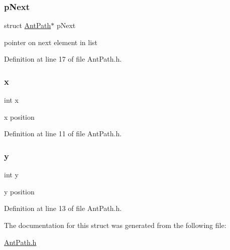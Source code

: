 \subsubsection{\texorpdfstring{p\+Next}{pNext}}
{\footnotesize\ttfamily struct \mbox{\hyperlink{struct_ant_path}{Ant\+Path}}$\ast$ p\+Next}

pointer on next element in list 

Definition at line 17 of file Ant\+Path.\+h.

\mbox{\label{struct_ant_path_a6150e0515f7202e2fb518f7206ed97dc}} 
\subsubsection{\texorpdfstring{x}{x}}
{\footnotesize\ttfamily int x}

x position 

Definition at line 11 of file Ant\+Path.\+h.

\mbox{\label{struct_ant_path_a0a2f84ed7838f07779ae24c5a9086d33}} 
\subsubsection{\texorpdfstring{y}{y}}
{\footnotesize\ttfamily int y}

y position 

Definition at line 13 of file Ant\+Path.\+h.



The documentation for this struct was generated from the following file\+:\begin{DoxyCompactItemize}
\item 
\mbox{\hyperlink{_ant_path_8h}{Ant\+Path.\+h}}\end{DoxyCompactItemize}
